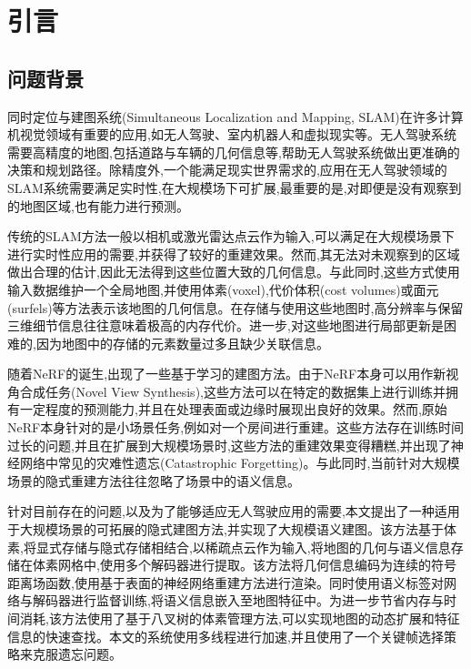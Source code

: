\section{引言}\label{introduction}

\subsection{问题背景}

同时定位与建图系统(Simultaneous Localization and Mapping, SLAM)在许多计算机视觉领域有重要的应用,如无人驾驶、室内机器人和虚拟现实等。无人驾驶系统需要高精度的地图,包括道路与车辆的几何信息等,帮助无人驾驶系统做出更准确的决策和规划路径。除精度外,一个能满足现实世界需求的,应用在无人驾驶领域的SLAM系统需要满足实时性,在大规模场下可扩展,最重要的是,对即便是没有观察到的地图区域,也有能力进行预测。

传统的SLAM方法一般以相机或激光雷达点云作为输入,可以满足在大规模场景下进行实时性应用的需要,并获得了较好的重建效果。然而,其无法对未观察到的区域做出合理的估计,因此无法得到这些位置大致的几何信息。与此同时,这些方式使用输入数据维护一个全局地图,并使用体素\cite{kahler}(voxel),代价体积\cite{learningDS}(cost volumes)或面元\cite{FusionDS}(surfels)等方法表示该地图的几何信息。在存储与使用这些地图时,高分辨率与保留三维细节信息往往意味着极高的内存代价。进一步,对这些地图进行局部更新是困难的,因为地图中的存储的元素数量过多且缺少关联信息。

随着NeRF\cite{nerf}的诞生,出现了一些基于学习的建图方法。由于NeRF本身可以用作新视角合成任务(Novel View Synthesis),这些方法可以在特定的数据集上进行训练并拥有一定程度的预测能力,并且在处理表面或边缘时展现出良好的效果。然而,原始NeRF本身针对的是小场景任务,例如对一个房间进行重建。这些方法存在训练时间过长的问题,并且在扩展到大规模场景时,这些方法的重建效果变得糟糕,并出现了神经网络中常见的灾难性遗忘(Catastrophic Forgetting)。与此同时,当前针对大规模场景的隐式重建方法往往忽略了场景中的语义信息。

针对目前存在的问题,以及为了能够适应无人驾驶应用的需要,本文提出了一种适用于大规模场景的可拓展的隐式建图方法,并实现了大规模语义建图。该方法基于体素,将显式存储与隐式存储相结合,以稀疏点云作为输入,将地图的几何与语义信息存储在体素网格中,使用多个解码器进行提取。该方法将几何信息编码为连续的符号距离场函数,使用基于表面的神经网络重建方法进行渲染。同时使用语义标签对网络与解码器进行监督训练,将语义信息嵌入至地图特征中。为进一步节省内存与时间消耗,该方法使用了基于八叉树的体素管理方法,可以实现地图的动态扩展和特征信息的快速查找。本文的系统使用多线程进行加速,并且使用了一个关键帧选择策略来克服遗忘问题。
